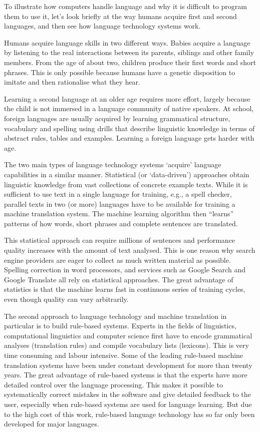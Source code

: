 \begin{multicols}{2}
    To illustrate how computers handle language and why it is difficult to program them to use it, let’s look briefly at the way humans acquire first and second languages, and then see how language technology systems work. 

    Humans acquire language skills in two different ways. Babies acquire a language by listening to the real interactions between its parents, siblings and other family members. From the age of about two, children produce their first words and short phrases. This is only possible because humans have a genetic disposition to imitate and then rationalise what they hear. 

    Learning a second language at an older age requires more effort, largely because the child is not immersed in a language community of native speakers. At school, foreign languages are usually acquired by learning grammatical structure, vocabulary and spelling using drills that describe linguistic knowledge in terms of abstract rules, tables and examples. Learning a foreign language gets harder with age.

    The two main types of language technology systems ‘acquire’ language capabilities in a similar manner. Statistical (or ‘data-driven’) approaches obtain linguistic knowledge from vast collections of concrete example texts. While it is sufficient to use text in a single language for training, e.g., a spell checker, parallel texts in two (or more) languages have to be available for training a machine translation system. The machine learning algorithm then “learns” patterns of how words, short phrases and complete sentences are translated. 

    This statistical approach can require millions of sentences and performance quality increases with the amount of text analysed. This is one reason why search engine providers are eager to collect as much written material as possible. Spelling correction in word processors, and services such as Google Search and Google Translate all rely on statistical approaches. The great advantage of statistics is that the machine learns fast in continuous series of training cycles, even though quality can vary arbitrarily.

    The second approach to language technology and machine translation in particular is to build rule-based systems. Experts in the fields of linguistics, computational linguistics and computer science first have to encode grammatical analyses (translation rules) and compile vocabulary lists (lexicons). This is very time consuming and labour intensive. Some of the leading rule-based machine translation systems have been under constant development for more than twenty years. The great advantage of rule-based systems is that the experts have more detailed control over the language processing. This makes it possible to systematically correct mistakes in the software and give detailed feedback to the user, especially when rule-based systems are used for language learning. But due to the high cost of this work, rule-based language technology has so far only been developed for major languages. 


\end{multicols}
